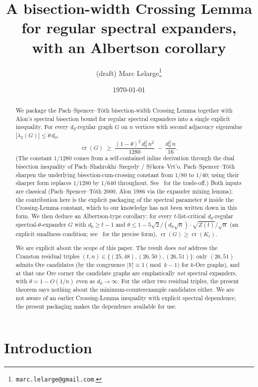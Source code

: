 \documentclass[11pt,a4paper]{article}
\title{A bisection-width Crossing Lemma for regular spectral
       expanders, with an Albertson corollary}
\author{(draft) Marc Lelarge\thanks{\texttt{marc.lelarge@gmail.com}.}}
\date{\today}
\theoremstyle{definition}
\DeclareMathOperator{\crN}{cr}
\begin{document}
\maketitle

\begin{abstract}
We package the Pach--Spencer--T\'oth bisection-width Crossing
Lemma together with Alon's spectral bisection bound for regular
spectral expanders into a single explicit inequality. For every
$d_0$-regular graph $G$ on $n$ vertices with second adjacency
eigenvalue $|\lambda_2(G)| \le \theta\,d_0$,
\[
   \crN(G) \;\ge\;
     \frac{(1 - \theta)^2\,d_0^{2}\,n^{2}}{1280}
     \;-\; \frac{d_0^{2}\,n}{16}.
\]
(The constant $1/1280$ comes from a self-contained inline
derivation through the dual bisection inequality of
Pach--Shahrokhi--Szegedy / Sýkora--Vrt'o. Pach--Spencer--T\'oth
sharpen the underlying bisection-cum-crossing constant from $1/80$
to $1/40$; using their sharper form replaces $1/1280$ by $1/640$
throughout. See~ for the trade-off.)
Both inputs are classical (Pach--Spencer--T\'oth 2000,
Alon 1986 via the expander mixing lemma); the contribution
here is the explicit packaging of the spectral parameter $\theta$
inside the Crossing-Lemma constant, which to our knowledge has not
been written down in this form. We then deduce an Albertson-type
corollary: for every $t$-list-critical $d_0$-regular
spectral-$\theta$-expander $G$ with $d_0 \ge t - 1$ and
$\theta \le 1 - 5\sqrt{2}/(d_0\sqrt{n})\cdot\sqrt{Z(t)} / \sqrt{n}$
(an explicit smallness condition; see~ for the
precise form), $\crN(G) \ge \crN(K_t)$.

We are explicit about the scope of this paper. The result does
\emph{not} address the Cranston residual triples $(t, n) \in
\{(25, 48), (26, 50), (26, 51)\}$: only $(26, 51)$ admits Ore
candidates (by the congruence $|V| \equiv 1 \pmod{k - 1}$ for
$k$-Ore graphs), and at that one Ore corner the candidate
graphs are emphatically \emph{not} spectral expanders, with
$\theta = 1 - O(1/n)$ even as $d_0 \to \infty$. For the other
two residual triples, the present theorem says nothing about
the minimum-counterexample candidates either. We are not aware
of an earlier Crossing-Lemma inequality with explicit spectral
dependence; the present packaging makes the dependence available
for use.
\end{abstract}

\section{Introduction}\label{sec:intro}
\end{document}
